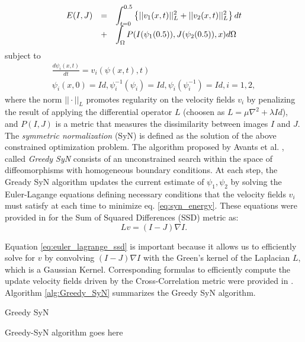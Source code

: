 \documentclass[11pt]{article}
\begin{document}
\begin{equation}\label{eq:syn_energy}
    \begin{array}{lll}
        E(I, J) &=& \mathlarger{\int_{t=0}^{0.5} \left\lbrace ||v_{1}(x, t)||_{L}^{2} + ||v_{2}(x, t)||_{L}^{2}  \right\rbrace dt}\\
        &+&\mathlarger{ \int_{\Omega} P(I(\psi_{1}(0.5)), J(\psi_{2}(0.5)), x) d\Omega}
    \end{array}
\end{equation}
subject to
\begin{displaymath}
    \begin{array}{l}
        \frac{d\psi_{i}(x, t)}{dt} = v_{i}(\psi(x,t),t)\\
        \psi_{i}(x, 0) = Id, \psi_{i}^{-1}(\psi_{i}) = Id, \psi_{i}(\psi_{i}^{-1}) = Id, i=1,2,
    \end{array}
\end{displaymath}
where the norm $||\cdot||_{L}$ promotes regularity on the velocity fields $v_{i}$ by penalizing the result of applying the differential operator $L$ (choosen as
$L = \mu \nabla^{2} + \lambda Id$), and $P(I, J)$ is a metric
that measures the dissimilarity between images $I$ and $J$. The {\it symmetric normalization} (SyN) is defined as the solution of the above constrained optimization problem.
The algorithm proposed by Avants et al. \cite{Avants2009}, called {\it Greedy SyN} consists of an unconstrained search within the space of diffeomorphisms with homogeneous boundary
conditions. At each step, the Gready SyN algorithm updates the current estimate of $\psi_{1}, \psi_{2}$ by solving the Euler-Lagange equations defining necessary conditions
that the velocity fields $v_{i}$ must satisfy at each time to minimize eq. \ref{eq:syn_energy}. These equations were provided in \cite{Avants2006} for the Sum of Squared
Differences (SSD) metric as:
\begin{equation}\label{eq:euler_lagrange_ssd}
    Lv = (I - J)\nabla I.
\end{equation}

Equation \ref{eq:euler_lagrange_ssd} is important because it allows us to efficiently solve for $v$ by convolving $(I - J)\nabla I$ with the Green's kernel of the Laplacian $L$, which
is a Gaussian Kernel. Corresponding formulas to efficiently compute the update velocity fields driven by the Cross-Correlation metric were provided in \cite{Avants2009}.
Algorithm \ref{alg:Greedy_SyN} summarizes the Greedy SyN algorithm.

\begin{algorithm}[h!]
\caption{Greedy SyN}\label{alg:Greedy_SyN}
\begin{algorithmic}[1]
\STATE Greedy-SyN algorithm goes here
\end{algorithmic}
\end{algorithm}
\end{document}
